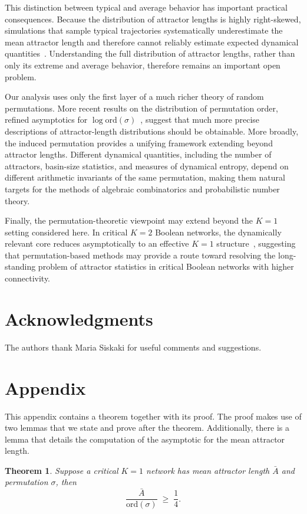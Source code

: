 \documentclass[11pt, reqno]{elsarticle}%
\theoremstyle{plain}
\newtheorem{theorem}[thm]{Theorem}%
\newcounter{comments}
\begin{document}
This distinction between typical and average behavior has important practical consequences. Because the distribution of attractor lengths is highly right-skewed, simulations that sample typical trajectories systematically underestimate the mean attractor length and therefore cannot reliably estimate expected dynamical quantities~\cite{finkexponential}. Understanding the full distribution of attractor lengths, rather than only its extreme and average behavior, therefore remains an important open problem.

Our analysis uses only the first layer of a much richer theory of random permutations. More recent results on the distribution of permutation order, refined asymptotics for $\log\mathrm{ord}(\sigma)$~\cite{ford2021cycle}, suggest that much more precise descriptions of attractor-length distributions should be obtainable. More broadly, the induced permutation provides a unifying framework extending beyond attractor lengths. Different dynamical quantities, including the number of attractors, basin-size statistics, and measures of dynamical entropy, depend on different arithmetic invariants of the same permutation, making them natural targets for the methods of algebraic combinatorics and probabilistic number theory.

Finally, the permutation-theoretic viewpoint may extend beyond the $K=1$ setting considered here. In critical $K=2$ Boolean networks, the dynamically relevant core reduces asymptotically to an effective $K=1$ structure~\cite{drosselreview}, suggesting that permutation-based methods may provide a route toward resolving the long-standing problem of attractor statistics in critical Boolean networks with higher connectivity.


\section*{Acknowledgments}
The authors thank Maria Siskaki for useful comments and
suggestions. 



\section*{Appendix}
This appendix contains a theorem together with its proof. The proof makes use of two lemmas that we state and prove after the theorem. Additionally, there is a lemma that details the computation of the asymptotic for the mean attractor length.
\\
\begin{theorem}\label{thm:mean_att_len}
    Suppose a critical $K=1$ network has mean attractor length $\bar{A}$ and permutation $\sigma$, then
\begin{equation}
  \frac{\bar{A}}{\mathrm{ord}(\sigma)}
  \;\ge\;
  \frac{1}{4}.
\end{equation}   
\end{theorem}
\end{document}
